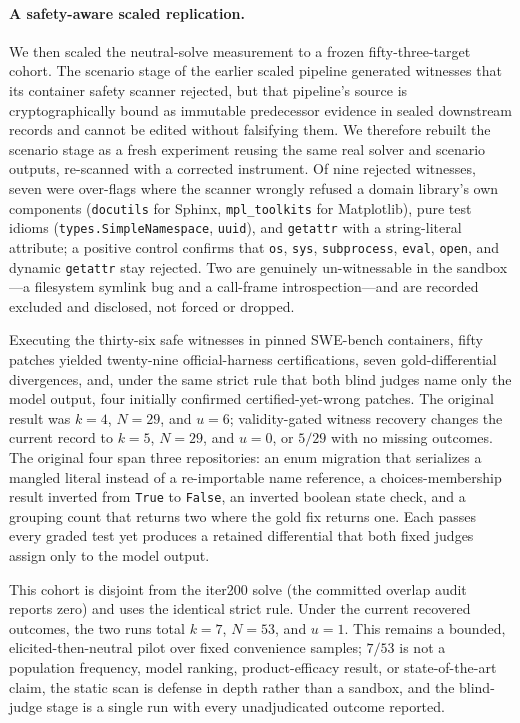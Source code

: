 \documentclass[11pt]{article}
\begin{document}
\paragraph{A safety-aware scaled replication.} We then scaled the neutral-solve measurement to a frozen
fifty-three-target cohort. The scenario stage of the earlier scaled pipeline generated witnesses that its
container safety scanner rejected, but that pipeline's source is cryptographically bound as immutable
predecessor evidence in sealed downstream records and cannot be edited without falsifying them. We therefore
rebuilt the scenario stage as a fresh experiment reusing the same real solver and scenario outputs, re-scanned
with a corrected instrument. Of nine rejected witnesses, seven were over-flags where the scanner wrongly
refused a domain library's own components (\texttt{docutils} for Sphinx, \texttt{mpl\_toolkits} for
Matplotlib), pure test idioms (\texttt{types.SimpleNamespace}, \texttt{uuid}), and \texttt{getattr} with a
string-literal attribute; a positive control confirms that \texttt{os}, \texttt{sys}, \texttt{subprocess},
\texttt{eval}, \texttt{open}, and dynamic \texttt{getattr} stay rejected. Two are genuinely un-witnessable in
the sandbox---a filesystem symlink bug and a call-frame introspection---and are recorded excluded and
disclosed, not forced or dropped.

Executing the thirty-six safe witnesses in pinned SWE-bench containers, fifty patches yielded twenty-nine
official-harness certifications, seven gold-differential divergences, and, under the same strict rule that
both blind judges name only the model output, four initially confirmed certified-yet-wrong patches. The
original result was $k=4$, $N=29$, and $u=6$; validity-gated witness recovery changes the current record to
$k=5$, $N=29$, and $u=0$, or $5/29$ with no missing outcomes. The original four span three repositories: an
enum migration that serializes a mangled literal instead of a
re-importable name reference, a choices-membership result inverted from \texttt{True} to \texttt{False}, an
inverted boolean state check, and a grouping count that returns two where the gold fix returns one. Each
passes every graded test yet produces a retained differential that both fixed judges assign only to the model
output.

This cohort is disjoint from the iter200 solve (the committed overlap audit reports zero) and uses the
identical strict rule. Under the current recovered outcomes, the two runs total $k=7$, $N=53$, and $u=1$.
This remains a bounded, elicited-then-neutral pilot over fixed convenience samples; $7/53$ is not a population
frequency, model ranking, product-efficacy result, or state-of-the-art
claim, the static scan is defense in depth rather than a sandbox, and the blind-judge stage is a single run
with every unadjudicated outcome reported.
\end{document}
